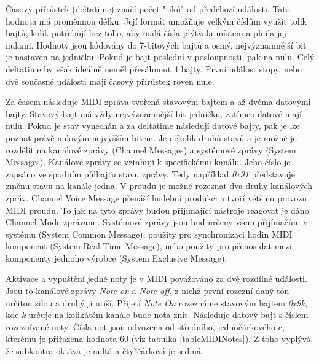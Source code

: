 Časový přírůstek (deltatime) značí počet "tiků" od předchozí události.
Tato hodnota má proměnnou délku.
Její formát umožňuje velkým číslům využít tolik bajtů, kolik potřebují bez toho,
aby malá čísla plýtvala místem a plnila jej nulami.
Hodnoty jsou kódovány do 7-bitových bajtů 
a osmý, nejvýznamnější bit je nastaven na jedničku.
Pokud je bajt poslední v posloupnosti, pak na nulu.
Celý deltatime by však ideálně neměl přesáhnout 4 bajty.
\cite{Neznamy_aboutMIDIFiles}
První událost stopy, nebo dvě současné události mají časový přírůstek roven nule.
\cite{Back_SMF_Specif}
\par

Za časem následuje MIDI zpráva tvořená stavovým bajtem a až dvěma datovými bajty.
Stavový bajt má vždy nejvýznamnější bit jedničku,
zatímco datové mají nulu.
Pokud je stav vynechán a za deltatime následují datové bajty, 
pak je lze poznat právě nulovým nejvyšším bitem.
Je několik druhů stavů a je možné je rozdělit na kanálové zprávy (Channel Messages) 
a systémové zprávy (System Messages).
Kanálové zprávy se vztahují k specifickému kanálu.
Jeho číslo je zapsáno ve spodním půlbajtu stavu zprávy.
Tedy například \emph{0x91} představuje změnu stavu na kanále jedna.
V proudu je možné rozeznat dva druhy kanálových zpráv.
Channel Voice Message přenáší hudební produkci a tvoří většinu provozu MIDI proudu.
To jak na tyto zprávy budou přijímající nástroje reagovat je dáno Channel Mode zprávami.
Systémové zprávy jsou buď určeny všem přijímačům v systému (System Common Message),
použity pro synchronizaci hodin MIDI komponent (System Real Time Message), 
nebo použity pro přenos dat mezi komponenty jednoho výrobce (System Exclusive Message). 
\cite{Back_SMF_Specif}
\par

Aktivace a vypuštění jedné noty je v MIDI považováno za dvě rozdílné události.
Jsou to kanálové zprávy \emph{Note on} a \emph{Note off},
z nichž první rozezní daný tón určitou silou a druhý ji utiší.
Přijetí \emph{Note On} rozeznáme stavovým bajtem \emph{0x9k}, 
kde \emph{k} určuje na kolikátém kanále bude nota znít.
Následuje datový bajt s číslem rozeznívané noty.
Čísla not jsou odvozena od středního, jednočárkového c, 
kterému je přiřazena hodnota 60 (viz tabulka \ref{tableMIDINotes}).
Z toho vyplývá, že subkontra oktáva je nultá a čtyřčárková je sedmá.


